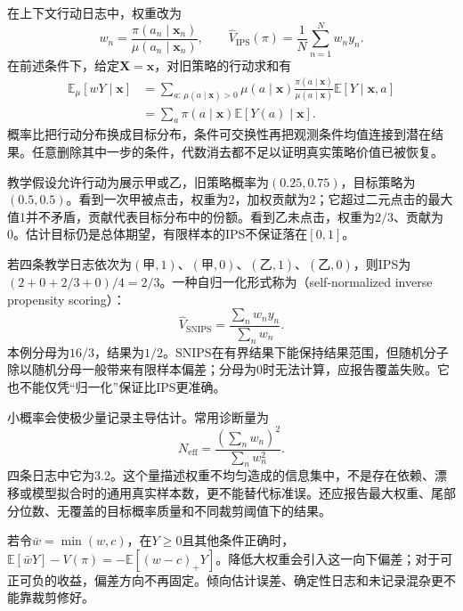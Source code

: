 在上下文行动日志中，权重改为
\begin{equation}
  w_n=\frac{\pi(a_n\mid\bm x_n)}
             {\mu(a_n\mid\bm x_n)},\qquad
  \widehat V_{\mathrm{IPS}}(\pi)
       =\frac{1}{N}\sum_{n=1}^{N}w_ny_n.
  \label{eq:rs-evaluation-policy-ips}
\end{equation}
在前述条件下，给定$\bm X=\bm x$，对旧策略的行动求和有
\[
  \begin{aligned}
    \mathbb E_\mu[wY\mid\bm x]
      &=\sum_{a:\,\mu(a\mid\bm x)>0}\mu(a\mid\bm x)
         \frac{\pi(a\mid\bm x)}{\mu(a\mid\bm x)}
         \mathbb E[Y\mid\bm x,a]\\
      &=\sum_a\pi(a\mid\bm x)\mathbb E[Y(a)\mid\bm x].
  \end{aligned}
\]
概率比把行动分布换成目标分布，条件可交换性再把观测条件均值连接到潜在结果。任意删除其中一步的条件，代数消去都不足以证明真实策略价值已被恢复。

教学假设允许行动为展示甲或乙，旧策略概率为$(0.25,0.75)$，目标策略为$(0.5,0.5)$。看到一次甲被点击，权重为2，加权贡献为2；它超过二元点击的最大值1并不矛盾，贡献代表目标分布中的份额。看到乙未点击，权重为$2/3$、贡献为0。估计目标仍是总体期望，有限样本的IPS不保证落在$[0,1]$。

若四条教学日志依次为$(\text{甲},1)$、$(\text{甲},0)$、$(\text{乙},1)$、$(\text{乙},0)$，则IPS为$(2+0+2/3+0)/4=2/3$。一种自归一化形式称为（self-normalized inverse propensity scoring）：
\begin{equation}
  \widehat V_{\mathrm{SNIPS}}
     =\frac{\sum_nw_ny_n}{\sum_nw_n}.
  \label{eq:rs-evaluation-snips}
\end{equation}
本例分母为$16/3$，结果为$1/2$。SNIPS在有界结果下能保持结果范围，但随机分子除以随机分母一般带来有限样本偏差；分母为0时无法计算，应报告覆盖失败。它也不能仅凭“归一化”保证比IPS更准确。

小概率会使极少量记录主导估计。常用诊断量为
\begin{equation}
  N_{\mathrm{eff}}
    =\frac{(\sum_n w_n)^2}{\sum_nw_n^2}.
  \label{eq:rs-evaluation-weight-ess}
\end{equation}
四条日志中它为3.2。这个量描述权重不均匀造成的信息集中，不是存在依赖、漂移或模型拟合时的通用真实样本数，更不能替代标准误。还应报告最大权重、尾部分位数、无覆盖的目标概率质量和不同裁剪阈值下的结果。

若令$\bar w=\min(w,c)$，在$Y\geq0$且其他条件正确时，$\mathbb E[\bar wY]-V(\pi)=-\mathbb E[(w-c)_+Y]$。降低大权重会引入这一向下偏差；对于可正可负的收益，偏差方向不再固定。倾向估计误差、确定性日志和未记录混杂更不能靠裁剪修好。

